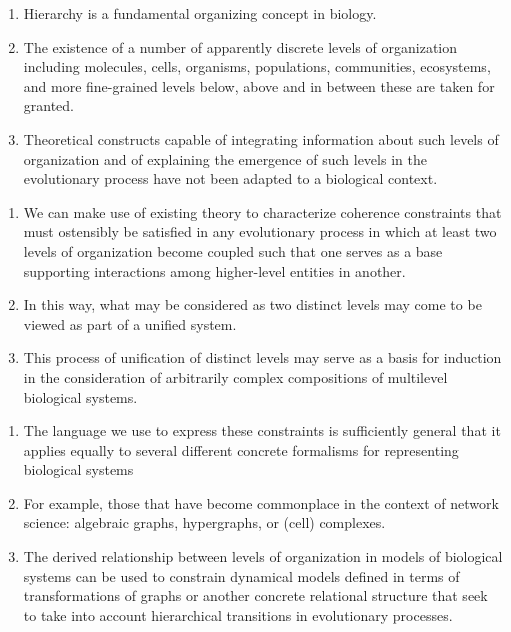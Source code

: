 \begin{frame}
\begin{enumerate}
\item Hierarchy is a fundamental organizing concept in biology. 
\pause \item The existence of a number of apparently discrete levels of organization including molecules, cells, organisms, populations, communities, ecosystems, and more fine-grained levels below, above and in between these are taken for granted. 
\pause \item Theoretical constructs capable of integrating information about such levels of organization and of explaining the emergence of such levels in the evolutionary process have not been adapted to a biological context.
\end{enumerate}
\end{frame}

\begin{frame}
\begin{enumerate}
\item We can make use of existing theory to characterize coherence constraints that must ostensibly be satisfied in any evolutionary process in which at least two levels of organization become coupled such that one serves as a base supporting interactions among higher-level entities in another. 
\pause \item In this way, what may be considered as two distinct levels may come to be viewed as part of a unified system. 
\pause \item This process of unification of distinct levels may serve as a basis for induction in the consideration of arbitrarily complex compositions of multilevel biological systems.
\end{enumerate}
\end{frame}

\begin{frame}
\begin{enumerate}
\item The language we use to express these constraints is sufficiently general that it applies equally to several different concrete formalisms for representing biological systems
\pause \item For example, those that have become commonplace in the context of network science: algebraic graphs, hypergraphs, or (cell) complexes. 
\pause \item The derived relationship between levels of organization in models of biological systems can be used to constrain dynamical models defined in terms of transformations of graphs or another concrete relational structure that seek to take into account hierarchical transitions in evolutionary processes.
\end{enumerate}
\end{frame}

